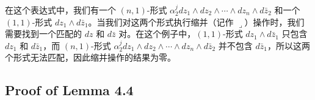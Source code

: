 \begin{remark}
      在这个表达式中，我们有一个 \((n,1)\)-形式 \(\alpha_2^j dz_1 \wedge dz_2 \wedge \cdots \wedge dz_n \wedge d\bar{z}_2\) 和一个 \((1,1)\)-形式 \(dz_1 \wedge d\bar{z}_1\)。当我们对这两个形式执行缩并（记作 \(\lrcorner\)）操作时，我们需要找到一个匹配的 \(dz\) 和 \(d\bar{z}\) 对。在这个例子中，\((1,1)\)-形式 \(dz_1 \wedge d\bar{z}_1\) 只包含 \(dz_1\) 和 \(d\bar{z}_1\)，而 \((n,1)\)-形式 \(\alpha_2^j dz_1 \wedge dz_2 \wedge \cdots \wedge dz_n \wedge d\bar{z}_2\) 并不包含 \(d\bar{z}_1\)，所以这两个形式无法匹配，因此缩并操作的结果为零。
\end{remark}

\subsection{Proof of Lemma 4.4}

